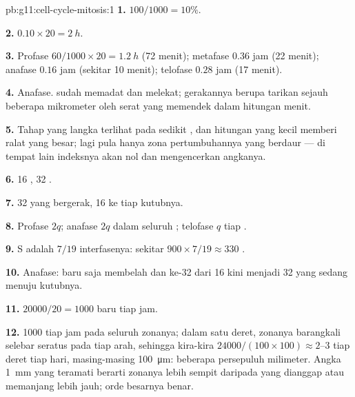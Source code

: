 \begin{solution}{pb:g11:cell-cycle-mitosis:1}
\textbf{1.} $100/1000 = 10\%$.

\textbf{2.} $0.10 \times 20 = \qty{2}{h}$.

\textbf{3.} Profase $60/1000 \times 20 = \qty{1.2}{h}$ (72 menit);
metafase $0.36$ jam (22 menit); anafase $0.16$ jam (sekitar 10 menit);
telofase $0.28$ jam (17 menit).

\textbf{4.} Anafase.  sudah memadat dan melekat; gerakannya
berupa tarikan sejauh beberapa mikrometer oleh serat yang memendek
dalam hitungan menit.

\textbf{5.} Tahap yang langka terlihat pada sedikit , dan hitungan
yang kecil memberi ralat yang besar; lagi pula hanya zona
pertumbuhannya yang berdaur --- di tempat lain indeksnya akan nol dan
mengencerkan angkanya.

\textbf{6.} 16 , 32 .

\textbf{7.} 32  yang bergerak, 16 ke tiap kutubnya.

\textbf{8.} Profase $2q$; anafase $2q$ dalam seluruh ; telofase
$q$ tiap .

\textbf{9.} S adalah $7/19$ interfasenya: sekitar $900 \times 7/19 \approx
330$ .

\textbf{10.} Anafase:  baru saja membelah dan ke-32
 dari 16  kini menjadi 32  yang sedang menuju
kutubnya.

\textbf{11.} $\num{20000}/20 = 1000$  baru tiap jam.

\textbf{12.} 1000  tiap jam pada seluruh zonanya; dalam satu deret,
zonanya barangkali selebar seratus  pada tiap arah, sehingga kira-kira
$\num{24000}/(100 \times 100) \approx 2$--3  tiap deret tiap hari,
masing-masing \qty{100}{\micro m}: beberapa persepuluh milimeter.
Angka \qty{1}{mm} yang teramati berarti zonanya lebih sempit daripada
yang dianggap atau  memanjang lebih jauh; orde besarnya benar.


\end{solution}
